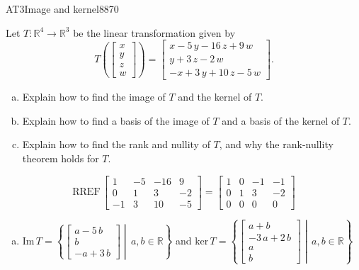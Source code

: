 \begin{exercise}{AT3}{Image and kernel}{8870} 
\begin{exerciseStatement} 

 Let \(T:\mathbb{R}^4 \to \mathbb{R}^3\) be the linear transformation given by \[T\left( \left[\begin{array}{c}
x \\
y \\
z \\
{w}
\end{array}\right] \right) = \left[\begin{array}{c}
x - 5 \, y - 16 \, z + 9 \, {w} \\
y + 3 \, z - 2 \, {w} \\
-x + 3 \, y + 10 \, z - 5 \, {w}
\end{array}\right].\] 

 

\begin{enumerate}[(a)]
\item Explain how to find the image of \(T\) and the kernel of \(T\).
\item Explain how to find a basis of the image of \(T\) and a basis of the kernel of \(T\).
\item Explain how to find the rank and nullity of \(T\), and why the rank-nullity theorem holds for \(T\).
\end{enumerate}

     \end{exerciseStatement}
 \begin{exerciseAnswer} 

\[\mathrm{RREF}\,\left[\begin{array}{cccc}
1 & -5 & -16 & 9 \\
0 & 1 & 3 & -2 \\
-1 & 3 & 10 & -5
\end{array}\right]=\left[\begin{array}{cccc}
1 & 0 & -1 & -1 \\
0 & 1 & 3 & -2 \\
0 & 0 & 0 & 0
\end{array}\right]\]

 

\begin{enumerate}[(a)]
\item  

 \(\mathrm{Im}\,T =  \left\{ \left[\begin{array}{c}
a - 5 \, b \\
b \\
-a + 3 \, b
\end{array}\right] \middle|\,a,b\in\mathbb{R}\right\}\) and \(\mathrm{ker}\,T = \left\{ \left[\begin{array}{c}
a + b \\
-3 \, a + 2 \, b \\
a \\
b
\end{array}\right] \middle|\,a,b\in\mathbb{R}\right\}\) 


\end{enumerate}
\end{exerciseAnswer}
\end{exercise}
